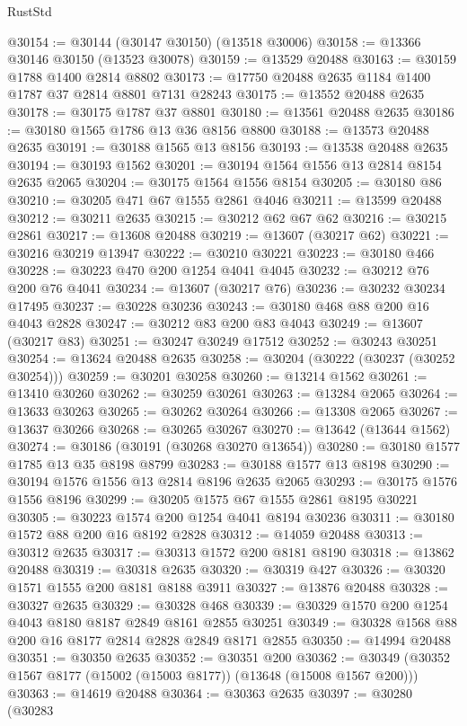 \begin{lexlean}{RustStd}
\begin{coremodule}
@30154 := @30144 (@30147 @30150) (@13518 @30006)
@30158 := @13366 @30146 @30150 (@13523 @30078)
@30159 := @13529 @20488
@30163 := @30159 @1788 @1400 @2814 @8802
@30173 := @17750 @20488 @2635 @1184 @1400 @1787 @37 @2814 @8801 @7131 @28243
@30175 := @13552 @20488 @2635
@30178 := @30175 @1787 @37 @8801
@30180 := @13561 @20488 @2635
@30186 := @30180 @1565 @1786 @13 @36 @8156 @8800
@30188 := @13573 @20488 @2635
@30191 := @30188 @1565 @13 @8156
@30193 := @13538 @20488 @2635
@30194 := @30193 @1562
@30201 := @30194 @1564 @1556 @13 @2814 @8154 @2635 @2065
@30204 := @30175 @1564 @1556 @8154
@30205 := @30180 @86
@30210 := @30205 @471 @67 @1555 @2861 @4046
@30211 := @13599 @20488
@30212 := @30211 @2635
@30215 := @30212 @62 @67 @62
@30216 := @30215 @2861
@30217 := @13608 @20488
@30219 := @13607 (@30217 @62)
@30221 := @30216 @30219 @13947
@30222 := @30210 @30221
@30223 := @30180 @466
@30228 := @30223 @470 @200 @1254 @4041 @4045
@30232 := @30212 @76 @200 @76 @4041
@30234 := @13607 (@30217 @76)
@30236 := @30232 @30234 @17495
@30237 := @30228 @30236
@30243 := @30180 @468 @88 @200 @16 @4043 @2828
@30247 := @30212 @83 @200 @83 @4043
@30249 := @13607 (@30217 @83)
@30251 := @30247 @30249 @17512
@30252 := @30243 @30251
@30254 := @13624 @20488 @2635
@30258 := @30204 (@30222 (@30237 (@30252 @30254)))
@30259 := @30201 @30258
@30260 := @13214 @1562
@30261 := @13410 @30260
@30262 := @30259 @30261
@30263 := @13284 @2065
@30264 := @13633 @30263
@30265 := @30262 @30264
@30266 := @13308 @2065
@30267 := @13637 @30266
@30268 := @30265 @30267
@30270 := @13642 (@13644 @1562)
@30274 := @30186 (@30191 (@30268 @30270 @13654))
@30280 := @30180 @1577 @1785 @13 @35 @8198 @8799
@30283 := @30188 @1577 @13 @8198
@30290 := @30194 @1576 @1556 @13 @2814 @8196 @2635 @2065
@30293 := @30175 @1576 @1556 @8196
@30299 := @30205 @1575 @67 @1555 @2861 @8195 @30221
@30305 := @30223 @1574 @200 @1254 @4041 @8194 @30236
@30311 := @30180 @1572 @88 @200 @16 @8192 @2828
@30312 := @14059 @20488
@30313 := @30312 @2635
@30317 := @30313 @1572 @200 @8181 @8190
@30318 := @13862 @20488
@30319 := @30318 @2635
@30320 := @30319 @427
@30326 := @30320 @1571 @1555 @200 @8181 @8188 @3911
@30327 := @13876 @20488
@30328 := @30327 @2635
@30329 := @30328 @468
@30339 := @30329 @1570 @200 @1254 @4043 @8180 @8187 @2849 @8161 @2855 @30251
@30349 := @30328 @1568 @88 @200 @16 @8177 @2814 @2828 @2849 @8171 @2855
@30350 := @14994 @20488
@30351 := @30350 @2635
@30352 := @30351 @200
@30362 := @30349 (@30352 @1567 @8177 (@15002 (@15003 @8177)) (@13648 (@15008 @1567 @200)))
@30363 := @14619 @20488
@30364 := @30363 @2635
@30397 := @30280
    (@30283

\end{coremodule}
\end{lexlean}
